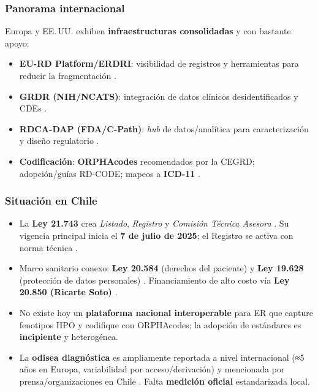 \documentclass{article}
\begin{document}
\subsubsection*{Panorama internacional}
Europa y EE.\,UU. exhiben \textbf{infraestructuras consolidadas} y con bastante apoyo:
\begin{itemize}[leftmargin=1.2em]
  \item \textbf{EU-RD Platform/ERDRI}: visibilidad de registros y herramientas para reducir la fragmentación \cite{eurd2025,erdriLaunch}.
  \item \textbf{GRDR (NIH/NCATS)}: integración de datos clínicos desidentificados y CDEs \cite{grdrCDE2015,grdrPortal}.
  \item \textbf{RDCA-DAP (FDA/C-Path)}: \textit{hub} de datos/analítica para caracterización y diseño regulatorio \cite{fdaRDCA,rdcadap2025,barrett2023}.
  \item \textbf{Codificación}: \textbf{ORPHAcodes} recomendados por la CEGRD; adopción/guías RD-CODE; mapeos a \textbf{ICD-11} \cite{rdcodeGuide,rdcodeIntro,orphaMappingsGuide,whoicd11faq,ayme2015,mazzucato2023,stateOfPlay2025}.
\end{itemize}

\subsubsection*{Situación en Chile}
\begin{itemize}[leftmargin=1.2em]
  \item La \textbf{Ley 21.743} crea \textit{Listado}, \textit{Registro} y \textit{Comisión Técnica Asesora} \cite{diariooficial2025,bcn2025}. Su vigencia principal inicia el \textbf{7 de julio de 2025}; el Registro se activa con norma técnica \cite{carey2025}.
  \item Marco sanitario conexo: \textbf{Ley 20.584} (derechos del paciente) y \textbf{Ley 19.628} (protección de datos personales) \cite{ley20584bcn,ley19628bcn,ley19628dipres}. Financiamiento de alto costo vía \textbf{Ley 20.850 (Ricarte Soto)} \cite{ley20850bcn,superRicarte}.
  \item No existe hoy un \textbf{plataforma nacional interoperable} para ER que capture fenotipos HPO y codifique con ORPHAcodes; la adopción de estándares es \textbf{incipiente} y heterogénea.
  \item La \textbf{odisea diagnóstica} es ampliamente reportada a nivel internacional (≈5 años en Europa, variabilidad por acceso/derivación) y mencionada por prensa/organizaciones en Chile \cite{eurordis2024,eurordis2024Nat,laTercera2024,fecher2025}. Falta \textbf{medición oficial} estandarizada local.
\end{itemize}
\end{document}
